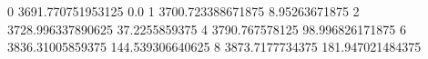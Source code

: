 0 3691.770751953125 0.0
1 3700.723388671875 8.95263671875
2 3728.996337890625 37.2255859375
4 3790.767578125 98.996826171875
6 3836.31005859375 144.539306640625
8 3873.7177734375 181.947021484375
